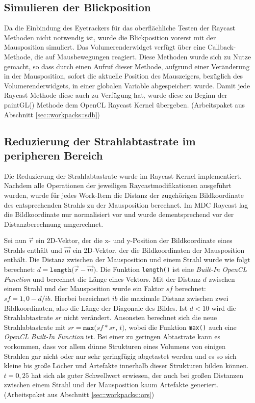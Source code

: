 \subsection{Simulieren der Blickposition}\label{sec::ida::sdb}
Da die Einbindung des Eyetrackers für das oberflächliche Testen der Raycast Methoden nicht notwendig ist, wurde die Blickposition vorerst mit der Mausposition simuliert.
Das Volumerenderwidget verfügt über eine Callback-Methode, die auf Mausbewegungen reagiert.
Diese Methoden wurde sich zu Nutze gemacht, so dass durch einen Aufruf dieser Methode, aufgrund einer Veränderung in der Mausposition, sofort die aktuelle Position des Mauszeigers, bezüglich des Volumerenderwidgets, in einer globalen Variable abgespeichert wurde.
Damit jede Raycast Methode diese auch zu Verfügung hat, wurde diese zu Beginn der paintGL() Methode dem OpenCL Raycast Kernel übergeben. (Arbeitspaket aus Abschnitt \ref{sec::workpacks::sdb})

\subsection{Reduzierung der Strahlabtastrate im peripheren Bereich}\label{sec::ida::rdsifb}
Die Reduzierung der Strahlabtastrate wurde im Raycast Kernel implementiert.
Nachdem alle Operationen der jeweiligen Raycastmodifikationen ausgeführt wurden, wurde für jedes Work-Item die Distanz der zugehörigen Bildkoordinate des entsprechenden Strahls zu der Mausposition berechnet.
Im MDC Raycast lag die Bildkoordinate nur normalisiert vor und wurde dementsprechend vor der Distanzberechnung umgerechnet.

Sei nun $\vec{r}$ ein 2D-Vektor, der die x- und y-Position der Bildkoordinate eines Strahls enthält und $\vec{m}$ ein 2D-Vektor, der die Bildkoordinaten der Mausposition enthält.
Die Distanz zwischen der Mausposition und einem Strahl wurde wie folgt berechnet: $d = \texttt{length(}\vec{r}-\vec{m}\texttt{)}$.
Die Funktion \texttt{length()} ist eine \emph{Built-In OpenCL Function} und berechnet die Länge eines Vektors.
Mit der Distanz $d$ zwischen einem Strahl und der Mausposition wurde ein Faktor $sf$ berechnet: $sf = 1,0 - d  / ib$.
Hierbei bezeichnet $ib$ die maximale Distanz zwischen zwei Bildkoordinaten, also die Länge der Diagonale des Bildes.
Ist $d < 10$ wird die Strahlabtastrate $sr$ nicht verändert.
Ansonsten berechnet sich die neue Strahlabtastrate mit $sr = \texttt{max(}sf * sr,\,t\texttt{)}$, wobei die Funktion \texttt{max()} auch eine \emph{OpenCL Built-In Function} ist.
Bei einer zu geringen Abtastrate kann es vorkommen, dass vor allem dünne Strukturen eines Volumens von einigen Strahlen gar nicht oder nur sehr geringfügig abgetastet werden und es so sich kleine bis große Löcher und Artefakte innerhalb dieser Strukturen bilden können.
$t = 0,25$ hat sich als guter Schwellwert erwiesen, der auch bei großen Distanzen zwischen einem Strahl und der Mausposition kaum Artefakte generiert. (Arbeitspaket aus Abschnitt \ref{sec::workpacks::ors})

